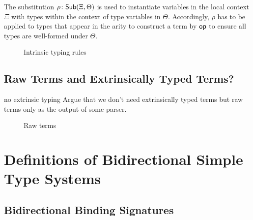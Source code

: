 \documentclass[acmsmall,screen]{acmart}
\theoremstyle{acmdefinition}
\begin{document}
The substitution $\rho\colon \Sub{\Xi}{\Theta}$ is used to instantiate variables in the local context $\Xi$ with types within the context of type variables in $\Theta$.
Accordingly, $\rho$ has to be applied to types that appear in the arity to construct a term by $\termOp$ to ensure all types are well-formed under $\Theta$.

\begin{figure}
  \centering
  \small
  \caption{Intrinsic typing rules}
  \label{fig:intrinsic-typing}
\end{figure}
\subsection{Raw Terms and Extrinsically Typed Terms?}
\begin{LTannote}{no extrinsic typing}
Argue that we don't need extrinsically typed terms but raw terms only as the output of some parser.
\end{LTannote}

\begin{figure}
  \centering
  \small
  \begin{mathpar}
  \end{mathpar}
  
  \caption{Raw terms}
\end{figure}

\section{Definitions of Bidirectional Simple Type Systems} 

\subsection{Bidirectional Binding Signatures}
\end{document}
